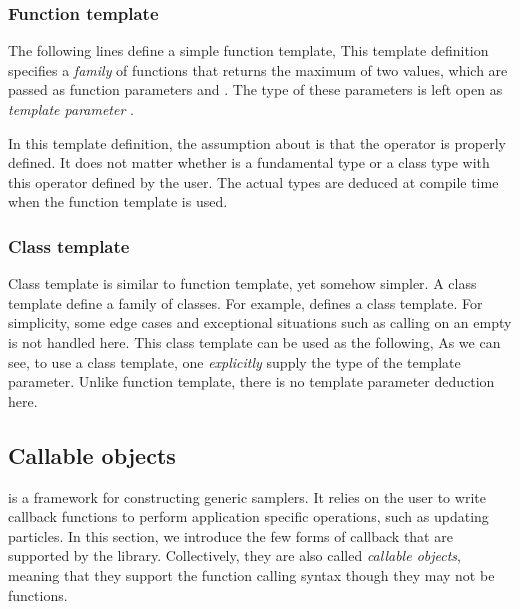 \subsubsection{Function template}
\label{ssub:Function template}

The following lines define a simple function template,
This template definition specifies a \emph{family} of functions that returns
the maximum of two values, which are passed as function parameters
 and . The type of these parameters is left open as
\emph{template parameter} .

In this template definition, the assumption about  is that the
operator \cppinline{<} is properly defined. It does not matter whether
 is a fundamental type or a class type with this operator defined
by the user. The actual types are deduced at compile time when the function
template is used.

\subsubsection{Class template}
\label{ssub:Class template}

Class template is similar to function template, yet somehow simpler. A class
template define a family of classes. For example,
defines a  class template. For simplicity, some edge cases
and exceptional situations such as calling  on an empty
 is not handled here. This class template can be used as the
following,
As we can see, to use a class template, one \emph{explicitly} supply the type
of the template parameter. Unlike function template, there is no template
parameter deduction here.

\subsection{Callable objects}
\label{sub:Callable objects}

\vsmc is a framework for constructing generic \smc samplers. It relies on the
user to write callback functions to perform application specific operations,
such as updating particles. In this section, we introduce the few forms of
callback that are supported by the library. Collectively, they are also called
\emph{callable objects}, meaning that they support the function calling syntax
though they may not be functions.

